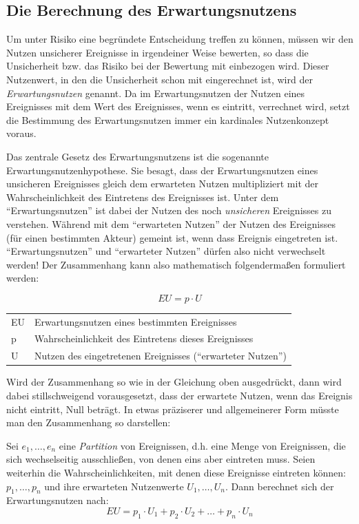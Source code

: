 \subsection{Die Berechnung des Erwartungsnutzens}
\label{Erwartungsnutzenhypothese}
Um unter Risiko eine begründete Entscheidung treffen zu können, müssen wir den
Nutzen unsicherer Ereignisse in irgendeiner Weise bewerten, so dass die
Unsicherheit bzw. das Risiko bei der Bewertung mit einbezogen wird. 
Dieser Nutzenwert, in den die Unsicherheit schon mit eingerechnet ist, wird der
{\em Erwartungsnutzen} genannt. Da im Erwartungsnutzen der Nutzen eines
Ereignisses mit dem Wert des Ereignisses, wenn es eintritt, verrechnet wird,
setzt die Bestimmung des Erwartungsnutzen immer ein kardinales Nutzenkonzept
voraus.

Das zentrale Gesetz des Erwartungsnutzens ist die sogenannte
Erwartungsnutzenhypothese. Sie besagt, dass der Erwartungsnutzen eines
unsicheren Ereignisses gleich dem erwarteten Nutzen multipliziert mit der
Wahrscheinlichkeit des Eintretens des Ereignisses ist. Unter dem
"`Erwartungsnutzen"' ist dabei der Nutzen des noch {\em unsicheren} Ereignisses
zu verstehen. Während mit dem "`erwarteten Nutzen"' der Nutzen des Ereignisses
(für einen bestimmten Akteur) gemeint ist, wenn dass Ereignis eingetreten ist.
"`Erwartungsnutzen"' und "`erwarteter Nutzen"' dürfen also nicht verwechselt
werden! Der Zusammenhang kann also mathematisch folgendermaßen formuliert werden:

\begin{equation*}
    EU = p \cdot U \label{EN1}
\end{equation*}

\begin{center}
\begin{tabular}{ll}
EU & Erwartungsnutzen eines bestimmten Ereignisses \\
 p & Wahrscheinlichkeit des Eintretens dieses Ereignisses \\
 U & Nutzen des eingetretenen Ereignisses ("`erwarteter Nutzen"')\\
\end{tabular}
\end{center}
Wird der Zusammenhang so wie in der Gleichung oben ausgedrückt, dann wird
dabei stillschweigend vorausgesetzt, dass der erwartete Nutzen, wenn das
Ereignis nicht eintritt, Null beträgt. In etwas präziserer und allgemeinerer
Form müsste man den Zusammenhang so darstellen: 

Sei $e_1,\ldots ,e_n$ eine
{\em Partition} von Ereignissen, d.h. eine Menge von Ereignissen, die sich
wechselseitig ausschließen, von denen eins aber eintreten muss. Seien weiterhin
die Wahrscheinlichkeiten, mit denen diese Ereignisse eintreten können:
$p_1,\ldots ,p_n$ und ihre erwarteten Nutzenwerte $U_1,\ldots ,U_n$. Dann
berechnet sich der Erwartungsnutzen nach:\label{Erwartungsnutzen}
\begin{equation*}
    EU = p_1 \cdot U_1 + p_2 \cdot U_2 + \ldots + p_n \cdot U_n
\end{equation*}

